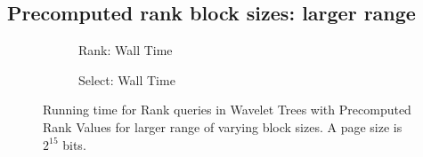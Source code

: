 \begin{appendices}


\section{Precomputed rank block sizes: larger range}
\begin{figure}[h!]\tiny
\begin{subfigure}{0.48\textwidth}
	
	\caption{Rank: Wall Time}
	\label{fig:PrecomputedRankBlockSize_Rank_WallTime}
\end{subfigure}
\hfill
\begin{subfigure}{0.48\textwidth}
	
	\caption{Select: Wall Time}
	\label{fig:PrecomputedRankBlockSize_Select_WallTime}
\end{subfigure}
\caption{Running time for Rank queries in Wavelet Trees with Precomputed Rank Values for larger range of varying block sizes. A page size is $2^{15}$ bits.}
\end{figure}

\end{appendices}
\restoregeometry